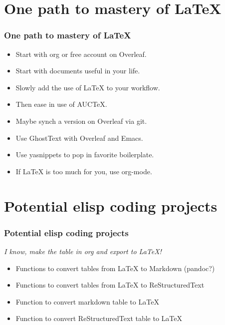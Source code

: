 \documentclass{beamer}
\begin{document}
\section{One path to mastery of \LaTeX}
\begin{frame}
\frametitle{One path to mastery of \LaTeX }
\begin{center}
\begin{Large}

\begin{itemize}[font=$\bullet$\scshape\bfseries]
\item Start with org or free account on Overleaf.
\item Start with documents useful in your life.
\item Slowly add the use of \LaTeX{} to your workflow.
\item Then ease in use of AUCTeX.
\item Maybe synch a version on Overleaf via git.
\item Use GhostText with Overleaf and Emacs.
\item Use yasnippets to pop in favorite boilerplate.
\item If \LaTeX{} is too much for you, use org-mode.
\end{itemize}
\end{Large}
\end{center}
\end{frame}


\section{Potential elisp coding projects}
\begin{frame}
\frametitle{Potential elisp coding projects}
\begin{center}
\begin{Large}
\emph{I know, make the table in org and export to LaTeX!}
\begin{itemize}[font=$\bullet$\scshape\bfseries]
\item Functions to convert tables from LaTeX to Markdown (pandoc?)
\item Functions to convert tables from LaTeX to ReStructuredText
\item Function to convert markdown table to LaTeX
\item Function to convert ReStructuredText table to LaTeX
\end{itemize}
\end{Large}
\end{center}
\end{frame}
\end{document}
